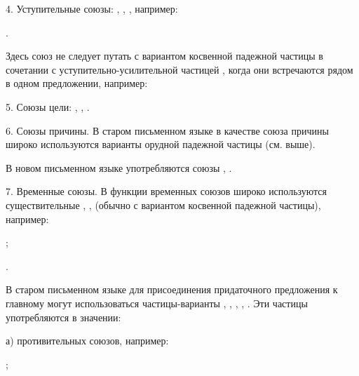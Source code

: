 4.	Уступительные союзы: , , , например:
\begin{prfsample}
	\item {}.
\end{prfsample}
Здесь союз  не следует путать с вариантом косвенной падежной частицы  в сочетании с уступительно-усилительной частицей , когда они встречаются рядом в одном предложении, например:
\begin{prfsample}
	\item {}
\end{prfsample}

5. Союзы цели: , , .

6. Союзы причины. В старом письменном языке в качестве союза причины широко используются варианты орудной падежной частицы (см. выше).

В новом письменном языке употребляются союзы , .

7. Временные союзы. В функции временных союзов широко используются существительные , ,  (обычно с вариантом косвенной падежной частицы), например:
\begin{prfsample}
	\item {};
	\item {}.
\end{prfsample}

В старом письменном языке для присоединения придаточного предложения к главному могут использоваться частицы-варианты , , , , . Эти частицы употребляются в значении:

а) противительных союзов, например:
\begin{prfsample}
	\item {};
\end{prfsample}

